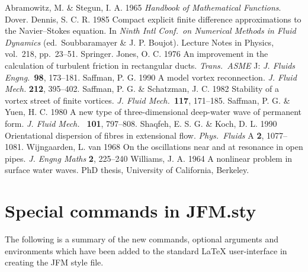 \begin{thebibliography}{} 
    {\sc Abramowitz, M. \& Stegun, I. A.} 1965
    {\em Handbook of Mathematical Functions}. Dover.
    {\sc Dennis, S. C. R.} 1985
    Compact explicit finite difference approximations to the
    Navier--Stokes equation. In {\em Ninth Intl Conf.\ on
    Numerical Methods in Fluid Dynamics\/} (ed.\ Soubbaramayer
    \& J. P. Boujot). Lecture Notes in Physics, vol.\ 218,
    pp.~23--51. Springer.
    {\sc Jones, O. C.} 1976
    An improvement in the calculation of turbulent friction in
    rectangular ducts. {\em Trans.\ ASME\/} J:
    {\em J. Fluids Engng.\ \/}{\bf 98}, 173--181.
    {\sc Saffman, P. G.} 1990
    A model vortex reconnection. {\em J. Fluid Mech.\/}
    {\bf 212}, 395--402.
    {\sc Saffman, P. G. \& Schatzman, J. C.} 1982
    Stability of a vortex street of finite vortices.
    {\em J. Fluid Mech.\ \/}{\bf 117}, 171--185.
    {\sc Saffman, P. G. \& Yuen, H. C.} 1980
    A new type of three-dimensional deep-water wave of permanent
    form. {\em J. Fluid Mech.\ } {\bf 101}, 797--808.
    {\sc Shaqfeh, E. S. G. \& Koch, D. L.} 1990
    Orientational dispersion of fibres in extensional flow.
    {\em Phys.\ Fluids} A {\bf 2}, 1077--1081.
    {\sc Wijngaarden, L. van} 1968
    On the oscillations near and at resonance in open pipes.
    {\em J. Engng Maths\/} {\bf 2}, 225--240
    {\sc Williams, J. A.} 1964
    A nonlinear problem in surface water waves. PhD thesis,
    University of California, Berkeley.
\end{thebibliography}
\newpage

\appendix
\section{Special commands in JFM.sty}

The following is a summary of the new commands, optional
arguments and environments which have been added to the
standard LaTeX user-interface in creating the JFM style file.

\vspace{6pt}

